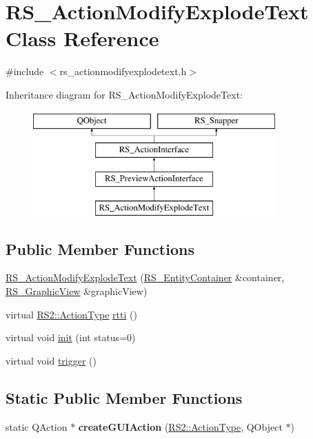 \hypertarget{classRS__ActionModifyExplodeText}{\section{R\-S\-\_\-\-Action\-Modify\-Explode\-Text Class Reference}
\label{classRS__ActionModifyExplodeText}
}


{\ttfamily \#include $<$rs\-\_\-actionmodifyexplodetext.\-h$>$}

Inheritance diagram for R\-S\-\_\-\-Action\-Modify\-Explode\-Text\-:\begin{figure}[H]
\begin{center}
\leavevmode
\includegraphics[height=4.000000cm]{classRS__ActionModifyExplodeText}
\end{center}
\end{figure}
\subsection*{Public Member Functions}
\begin{DoxyCompactItemize}
\item 
\hyperlink{classRS__ActionModifyExplodeText_afd4de05d661a1e43a8ab0a76fb57a5f9}{R\-S\-\_\-\-Action\-Modify\-Explode\-Text} (\hyperlink{classRS__EntityContainer}{R\-S\-\_\-\-Entity\-Container} \&container, \hyperlink{classRS__GraphicView}{R\-S\-\_\-\-Graphic\-View} \&graphic\-View)
\item 
virtual \hyperlink{classRS2_afe3523e0bc41fd637b892321cfc4b9d7}{R\-S2\-::\-Action\-Type} \hyperlink{classRS__ActionModifyExplodeText_ab7793621248283e607c46ad11a261b79}{rtti} ()
\item 
virtual void \hyperlink{classRS__ActionModifyExplodeText_a130d880fd6f13fa3b19e285d27ef47e8}{init} (int status=0)
\item 
virtual void \hyperlink{classRS__ActionModifyExplodeText_a92733f1c0884f75610998f41553029df}{trigger} ()
\end{DoxyCompactItemize}
\subsection*{Static Public Member Functions}
\begin{DoxyCompactItemize}
\item 
\hypertarget{classRS__ActionModifyExplodeText_a6aca3e5ffbf61e6e71afdf8b984b3b49}{static Q\-Action $\ast$ {\bfseries create\-G\-U\-I\-Action} (\hyperlink{classRS2_afe3523e0bc41fd637b892321cfc4b9d7}{R\-S2\-::\-Action\-Type}, Q\-Object $\ast$)}\label{classRS__ActionModifyExplodeText_a6aca3e5ffbf61e6e71afdf8b984b3b49}

\end{DoxyCompactItemize}
